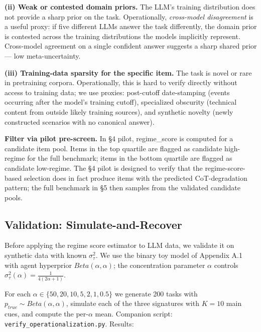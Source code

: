 \documentclass{article}
\begin{document}
\textbf{(ii) Weak or contested domain priors.} The LLM's training
distribution does not provide a sharp prior on the task. Operationally,
\emph{cross-model disagreement} is a useful proxy: if five different
LLMs answer the task differently, the domain prior is contested across
the training distributions the models implicitly represent. Cross-model
agreement on a single confident answer suggests a sharp shared prior ---
low meta-uncertainty.

\textbf{(iii) Training-data sparsity for the specific item.} The task is
novel or rare in pretraining corpora. Operationally, this is hard to
verify directly without access to training data; we use proxies:
post-cutoff date-stamping (events occurring after the model's training
cutoff), specialized obscurity (technical content from outside likely
training sources), and synthetic novelty (newly constructed scenarios
with no canonical answer).

\textbf{Filter via pilot pre-screen.} In \S{}4 pilot, regime\_score is
computed for a candidate item pool. Items in the top quartile are
flagged as candidate high-regime for the full benchmark; items in the
bottom quartile are flagged as candidate low-regime. The \S{}4 pilot is
designed to verify that the regime-score-based selection does in fact
produce items with the predicted CoT-degradation pattern; the full
benchmark in \S{}5 then samples from the validated candidate pools.

\subsection{Validation:
Simulate-and-Recover}\label{validation-simulate-and-recover}

Before applying the regime score estimator to LLM data, we validate it
on synthetic data with known \(\sigma_{\tau}^{2}\). We use the binary
toy model of Appendix A.1 with agent hyperprior \(Beta(\alpha,\alpha)\);
the concentration parameter \(\alpha\) controls
\(\sigma_{\tau}^{2}(\alpha) = \frac{1}{4(2\alpha + 1)}\).

For each \(\alpha \in \{ 50,20,10,5,2,1,0.5\}\) we generate 200 tasks
with \(p_{true} \sim Beta(\alpha,\alpha)\), simulate each of the three
signatures with \(K = 10\) main cues, and compute the per-\(\alpha\)
mean. Companion script: \texttt{verify\_operationalization.py}. Results:
\end{document}
